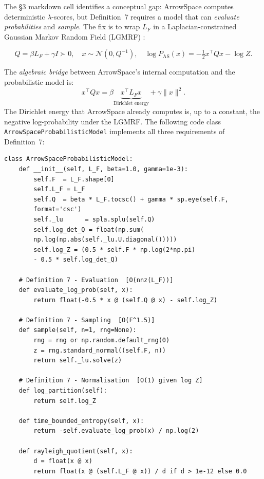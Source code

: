 \documentclass[12pt,a4paper]{article}
\theoremstyle{plain}
\theoremstyle{definition}
\theoremstyle{remark}
\newcommand{\1}{\mathbf{1}}
\begin{document}
	The §3 markdown cell identifies a conceptual gap: ArrowSpace computes
	deterministic $\lambda$-scores, but Definition~7 requires a model that
	can \emph{evaluate probabilities} and \emph{sample}.
	The fix is to wrap $L_F$ in a Laplacian-constrained Gaussian Markov
	Random Field (LGMRF) \citep{DongLaplacianGMRF, YingLaplacianConstraints,
		RueHeldGMRF}:
	
	\begin{equation}
		\label{eq:lgmrf}
		Q = \beta L_F + \gamma I \succ 0,\quad
		x\sim\mathcal{N}(0, Q^{-1}),\quad
		\log P_\mathrm{AS}(x) = -\tfrac{1}{2}x^\top Qx - \log Z.
	\end{equation}
	
	The \emph{algebraic bridge} between ArrowSpace's internal computation
	and the probabilistic model is:
	\[
	x^\top Qx
	= \beta\underbrace{x^\top L_F x}_{\text{Dirichlet energy}}
	+ \gamma\|x\|^2.
	\]
	The Dirichlet energy that ArrowSpace already computes is, up to a
	constant, the negative log-probability under the LGMRF.
	The following code class \texttt{ArrowSpaceProbabilisticModel}
	implements all three requirements of Definition~7:
	
	\begin{lstlisting}[caption={LGMRF wrapper satisfying Definition~7},
		label={lst:lgmrfclass}]
class ArrowSpaceProbabilisticModel:
	def __init__(self, L_F, beta=1.0, gamma=1e-3):
		self.F  = L_F.shape[0]
		self.L_F = L_F
		self.Q  = beta * L_F.tocsc() + gamma * sp.eye(self.F,
		format='csc')
		self._lu      = spla.splu(self.Q)
		self.log_det_Q = float(np.sum(
		np.log(np.abs(self._lu.U.diagonal()))))
		self.log_Z = (0.5 * self.F * np.log(2*np.pi)
		- 0.5 * self.log_det_Q)
		
	# Definition 7 - Evaluation  [O(nnz(L_F))]
	def evaluate_log_prob(self, x):
		return float(-0.5 * x @ (self.Q @ x) - self.log_Z)
		
	# Definition 7 - Sampling  [O(F^1.5)]
	def sample(self, n=1, rng=None):
		rng = rng or np.random.default_rng(0)
		z = rng.standard_normal((self.F, n))
		return self._lu.solve(z)
		
	# Definition 7 - Normalisation  [O(1) given log Z]
	def log_partition(self):
		return self.log_Z
		
	def time_bounded_entropy(self, x):
		return -self.evaluate_log_prob(x) / np.log(2)
		
	def rayleigh_quotient(self, x):
		d = float(x @ x)
		return float(x @ (self.L_F @ x)) / d if d > 1e-12 else 0.0
	\end{lstlisting}
	
\end{document}

